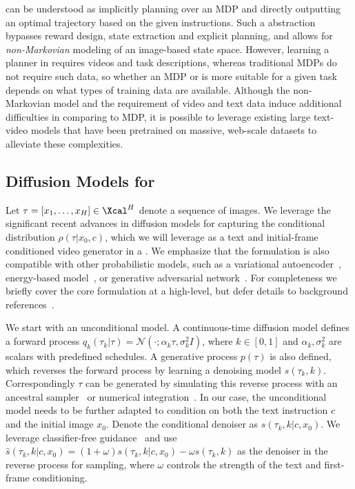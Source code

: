 \proc can be understood as implicitly planning over an MDP and directly outputting an optimal trajectory based on the given instructions. 
Such a \proc abstraction bypasses reward design, state extraction and explicit planning, and allows for \emph{non-Markovian} modeling of an image-based state space.
However, learning a planner in \proc requires videos and task descriptions, whereas traditional MDPs do not require such data, so whether an MDP or \proc is more suitable for a given task depends on what types of training data are available. 
Although the non-Markovian model and the requirement of video and text data induce additional difficulties in \proc comparing to MDP, it is possible to leverage existing large text-video models that have been pretrained on massive, web-scale datasets to alleviate these complexities. 



\vspace{-3pt}
\subsection{Diffusion Models for \proc}\label{subsec:diffusion} 
\vspace{-3pt}

Let $\tau = [x_1, \ldots, x_H]\in \Xcal^{H}$ denote a sequence of images. 
We leverage the significant recent advances in diffusion models for capturing the conditional distribution $\rho(\tau |x_0, c)$, which we will leverage as a text and initial-frame conditioned video generator in a \proc. 
We emphasize that the \proc formulation is also compatible with other probabilistic models, such as a variational autoencoder~\citep{kingma2013vae}, energy-based model~\citep{du2019implicit,dai2019exponential}, or generative adversarial network~\citep{goodfellow2014gan}. 
For completeness we briefly cover the core formulation at a high-level, but defer details to background references~\citep{sohldickstein2015nonequilibrium}. 

We start with an unconditional model. A continuous-time diffusion model defines a forward process $q_k(\tau_k|\tau) = \mathcal{N}(\cdot; \alpha_k\tau, \sigma_k^2 I)$, where $k \in [0, 1]$ and $\alpha_k, \sigma_k^2$ are scalars with predefined schedules. A generative process $p(\tau)$ is also defined, which reverses the forward process by learning a denoising model $s(\tau_k, k)$. Correspondingly $\tau$ can be generated by simulating this reverse process with an ancestral sampler~\citep{ho2020denoising} or numerical integration~\citep{song2020denoising}. In our case, the unconditional model needs to be further adapted to condition on both the text instruction $c$ and the initial image $x_0$. Denote the conditional denoiser as $s(\tau_k, k|c, x_0)$. 
We leverage classifier-free guidance~\citep{ho2022classifier} and use $\hat{s}(\tau_k, k|c, x_0) = (1+\omega) s(\tau_k, k|c, x_0) - \omega s(\tau_k, k)$ as the denoiser in the reverse process for sampling, where $\omega$ controls the strength of the text and first-frame conditioning.